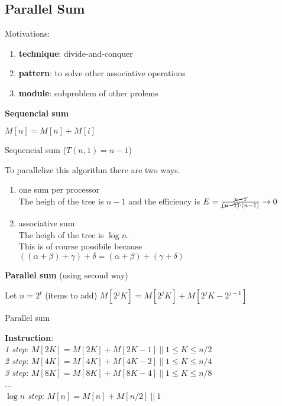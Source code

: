 \subsection{Parallel Sum}

Motivations:
\begin{enumerate}
 \item \textbf{technique}: divide-and-conquer
 \item \textbf{pattern}: to solve other associative operations
 \item \textbf{module}: subproblem of other prolems
\end{enumerate}

\textbf{Sequencial sum}\\
\begin{algorithm}[H]
 \SetAlgoLined
  {
  $M[n] = M[n] + M[i]$ 
 }
 \caption{Sequencial sum ($T(n,1) = n-1$)}
\end{algorithm}

To parallelize this algorithm there are two ways.
\begin{enumerate}
 \item one sum per processor\\
 The heigh of the tree is $n-1$ and the efficiency is $E = \frac{\cancel{n-1}}{\cancel{(n-1)} \cdot (n-1)} \rightarrow 0$
 \item associative sum\\
 The heigh of the tree is $\log{n}$. \\
 This is of course possibile because $((\alpha+\beta)+\gamma)+\delta = (\alpha+\beta)+(\gamma+\delta)$
\end{enumerate}

\textbf{Parallel sum} (using second way)\\
\begin{algorithm}[H]
 \SetAlgoLined
 Let $n = 2^t$ (items to add)
  {
   {
   $M[2^{j}K] = M[2^{j}K] + M[2^{j}K - 2^{j-1}]$ 
  } 
 }
 \caption{Parallel sum}
\end{algorithm}

\textbf{Instruction}:\\
\textit{1 step}: $M[2K] = M[2K] + M[2K-1] \ || \ 1 \leq K \leq n/2$\\
\textit{2 step}: $M[4K] = M[4K] + M[4K-2] \ || \ 1 \leq K \leq n/4$\\
\textit{3 step}: $M[8K] = M[8K] + M[8K-4] \ || \ 1 \leq K \leq n/8$\\
...\\
\textit{$\log{n}$ step}: $M[n] = M[n] + M[n/2] \ || \ 1$\\

